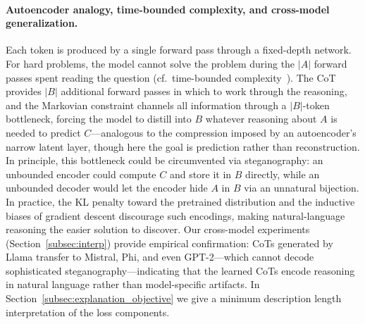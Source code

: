 \documentclass{article} %
\begin{document}
\paragraph{Autoencoder analogy, time-bounded complexity, and cross-model generalization.}
Each token is produced by a single forward pass through a fixed-depth network. For hard problems, the model cannot solve the problem during the $|A|$ forward passes spent reading the question (cf.\ time-bounded complexity~\citep{LiVitanyi2019}). The CoT provides $|B|$ additional forward passes in which to work through the reasoning, and the Markovian constraint channels all information through a $|B|$-token bottleneck, forcing the model to distill into $B$ whatever reasoning about $A$ is needed to predict $C$---analogous to the compression imposed by an autoencoder's narrow latent layer, though here the goal is prediction rather than reconstruction. In principle, this bottleneck could be circumvented via steganography: an unbounded encoder could compute $C$ and store it in $B$ directly, while an unbounded decoder would let the encoder hide $A$ in $B$ via an unnatural bijection. In practice, the KL penalty toward the pretrained distribution and the inductive biases of gradient descent discourage such encodings, making natural-language reasoning the easier solution to discover. Our cross-model experiments (Section~\ref{subsec:interp}) provide empirical confirmation: CoTs generated by Llama transfer to Mistral, Phi, and even GPT-2---which cannot decode sophisticated steganography---indicating that the learned CoTs encode reasoning in natural language rather than model-specific artifacts. In Section~\ref{subsec:explanation_objective} we give a minimum description length interpretation of the loss components.
\end{document}
